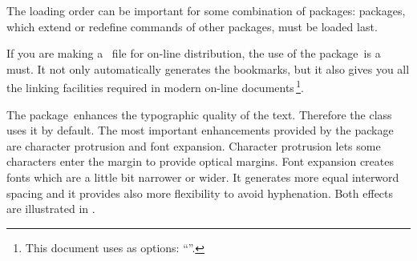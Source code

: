 The loading order can be important for some combination of packages:
packages, which extend or redefine commands of other packages, must be
loaded last.

If you are making a \PDF\ file for on-line distribution, the use of the
 package\,\cite{pkg:hyperref} is a must. It not only
automatically generates the bookmarks, but it also gives you all the
linking facilities required in modern on-line documents\,\footnote{This
  document uses as  options: ``''.}.

The  package\,\cite{pkg:microtype} enhances the typographic
quality of the text. Therefore the  class uses it by default.
The most important enhancements provided by the package are character
protrusion and font expansion. Character protrusion lets some characters
enter the margin to provide optical margins. Font expansion creates fonts
which are a little bit narrower or wider. It generates more equal interword
spacing and it provides also more flexibility to avoid hyphenation. Both
effects are illustrated in .
